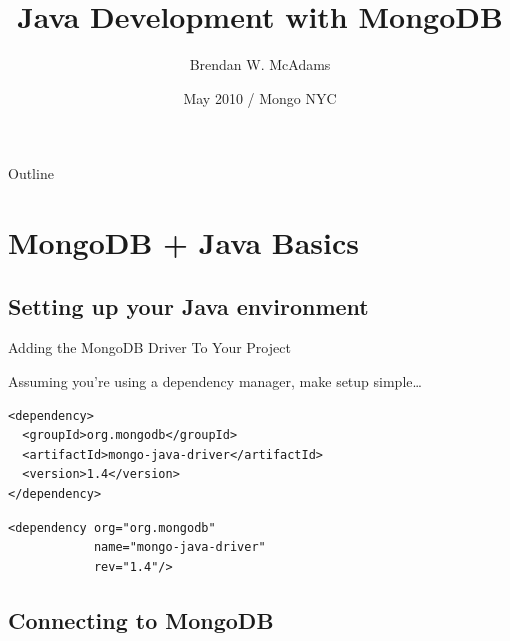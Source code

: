 \documentclass{beamer}
\title[Java Development with MongoDB] %
{Java Development with MongoDB}
\author[Brendan W. McAdams] 
{Brendan W. McAdams\\
}
\institute[Novus Partners, Inc.] %
{ Novus Partners, Inc.\\
  http://novus.com }
\date[Mongo NYC, May 2010] %
{May 2010 / Mongo NYC}
\begin{document}
\begin{frame}
  \titlepage
\end{frame}

\begin{frame}{Outline}
  \tableofcontents
\end{frame}




\section{MongoDB + Java Basics}

\subsection[Getting Started]{Setting up your Java environment}

\begin{frame}[fragile]{Adding the MongoDB Driver To Your Project}
 
  Assuming you're using a dependency manager, make setup simple\dots
    \pause
\begin{lstlisting}[caption=Maven Dependency]
<dependency>
  <groupId>org.mongodb</groupId>
  <artifactId>mongo-java-driver</artifactId>
  <version>1.4</version>
</dependency>
\end{lstlisting}
\begin{lstlisting}[caption=Ivy Dependency]
<dependency org="org.mongodb" 
            name="mongo-java-driver" 
            rev="1.4"/>
\end{lstlisting}
\end{frame}

\subsection[Connecting to MongoDB]{Connecting to MongoDB}
\end{document}
